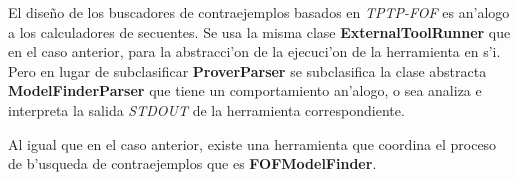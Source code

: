 El diseño de los buscadores de contraejemplos basados en \textit{TPTP-FOF} es an'alogo a los calculadores de secuentes. Se usa la misma clase \textbf{ExternalToolRunner} que en el caso anterior, para la abstracci'on de la ejecuci'on de la herramienta en s'i. Pero en lugar de subclasificar \textbf{ProverParser} se subclasifica la clase abstracta \textbf{ModelFinderParser} que tiene un comportamiento an'alogo, o sea analiza e interpreta la salida \textit{STDOUT} de la herramienta correspondiente.

Al igual que en el caso anterior, existe una herramienta que coordina el proceso de b'usqueda de contraejemplos que es \textbf{FOFModelFinder}.
